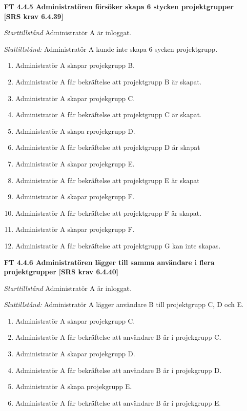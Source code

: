 \documentclass[a4paper]{article}
\begin{document}
\textbf{FT 4.4.5 Administratören försöker skapa 6 stycken projektgrupper [SRS krav 6.4.39]}

\emph{Starttillstånd} Administratör A är inloggat.

\emph{Sluttillstånd:} Administratör A kunde inte skapa 6 sycken  projektgrupp.

\begin{enumerate}
\item Administratör A skapar projekgrupp B.
\item Administratör A får bekräftelse att projektgrupp B är skapat.
\item Administratör A skapar projekgrupp C.
\item Administratör A får bekräftelse att projektgrupp C är skapat.
\item Administratör A skapa rprojekgrupp D.
\item Administratör A får bekräftelse att projektgrupp D är skapat
\item Administratör A skapar projekgrupp E.
\item Administratör A får bekräftelse att projektgrupp E är skapat
\item Administratör A skapar projekgrupp F.
\item Administratör A får bekräftelse att projektgrupp F är skapat.
\item Administratör A skapar projekgrupp F.
\item Administratör A får bekräftelse att projektgrupp G kan inte skapas.
\end{enumerate}

\textbf{FT 4.4.6 Administratören lägger till samma användare i flera projektgrupper [SRS krav 6.4.40]}

\emph{Starttillstånd} Administratör A är inloggat.

\emph{Sluttillstånd:} Administratör A lägger användare B till   projektgrupp C, D och E.

\begin{enumerate}
\item Administratör A skapar projekgrupp C.
\item Administratör A får bekräftelse att användare B är i projekgrupp C.
\item Administratör A skapar projekgrupp D.
\item Administratör A får bekräftelse att användare B är i projekgrupp D.
\item Administratör A skapa projekgrupp E.
\item Administratör A får bekräftelse att användare B är i projekgrupp E.
\end{enumerate}
\end{document}
